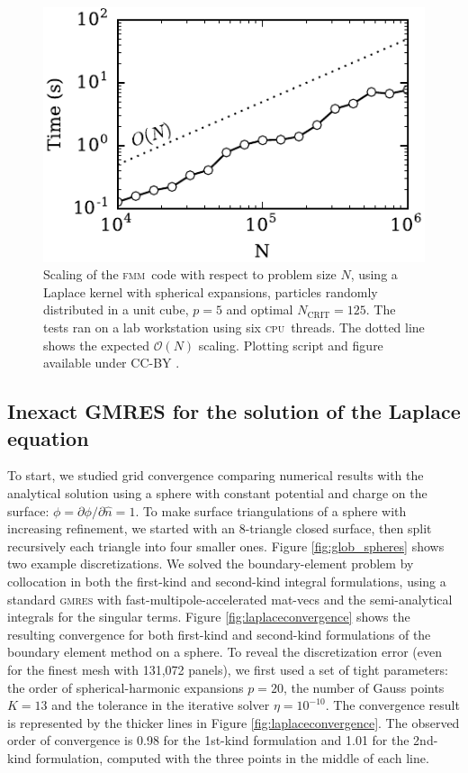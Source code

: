 \documentclass[final,3p,times]{elsarticle}
\newcommand{\cpu}{\textsc{cpu}}
\newcommand{\fmm}{\textsc{fmm}\xspace}
\renewcommand{\O}[1]{\mathcal{O}(#1)}
\newcommand{\ncrit}{N_{\text{CRIT}}}
\newcommand{\gmres}{\textsc{gmres}\xspace}
\newcommand{\partialdi}[2]{\partial #1 / \partial #2}
\newcommand{\nhat}{\hat{n}}
\begin{document}
\begin{figure}[h]
\begin{center}
	\includegraphics[width=0.5 \textwidth]{FMMScaling.pdf}
	\caption{Scaling of the \fmm\ code with respect to problem size $N$, using a Laplace kernel with spherical expansions, particles randomly distributed in a unit cube, $p=5$ and optimal $\ncrit = 125$. The tests ran on a lab workstation using six \cpu\ threads. The dotted line shows the expected $\O{N}$ scaling. Plotting script and figure available under CC-BY \cite{WangLaytonBarba2016-figshare1}.}
	\label{fig:fmm_scaling}
\end{center}
\end{figure}

\subsection{Inexact {\small GMRES} for the solution of the Laplace equation}
\label{sec:inexactLaplace}
To start, we studied grid convergence comparing numerical results with the analytical solution using a sphere with constant potential and charge on the surface: $\phi = \partialdi{\phi}{\nhat} = 1$. To make surface triangulations of a sphere with increasing refinement, we started with an 8-triangle closed surface, then split recursively each triangle into four smaller ones. Figure \ref{fig:glob_spheres} shows two example discretizations. We solved the boundary-element problem by collocation in both the first-kind and second-kind integral formulations, using a standard \gmres with fast-multipole-accelerated mat-vecs and the semi-analytical integrals for the singular terms. Figure \ref{fig:laplaceconvergence} shows the resulting convergence for both first-kind and second-kind formulations of the boundary element method on a sphere. To reveal the discretization error (even for the finest mesh with 131,072 panels), we first used a set of tight parameters: the order of spherical-harmonic expansions $p=20$, the number of Gauss points $K=13$ and the tolerance in the iterative solver $\eta=10^{-10}$. The convergence result is represented by the thicker lines in Figure \ref{fig:laplaceconvergence}. The observed order of convergence is 0.98 for the 1st-kind formulation and 1.01 for the 2nd-kind formulation, computed with the three points in the middle of each line. 
\end{document}
